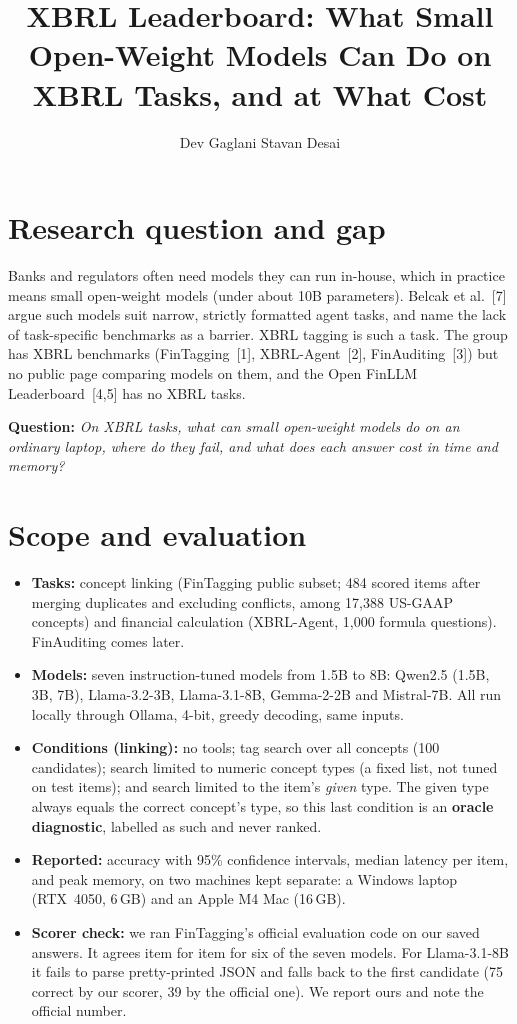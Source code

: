 \documentclass[10pt]{article}
\title{\vspace{-1.5cm}\large\textbf{XBRL Leaderboard: What Small Open-Weight Models Can Do on XBRL Tasks, and at What Cost}}
\author{\normalsize Dev Gaglani \quad Stavan Desai}
\date{}
\begin{document}
\maketitle
\vspace{-1.3cm}

\section{Research question and gap}
Banks and regulators often need models they can run in-house, which in practice means small open-weight models
(under about 10B parameters). Belcak et al.~[7] argue such models suit narrow, strictly formatted agent tasks, and name
the lack of task-specific benchmarks as a barrier. XBRL tagging is such a task. The group has XBRL benchmarks
(FinTagging~[1], XBRL-Agent~[2], FinAuditing~[3]) but no public page comparing models on them, and the Open FinLLM
Leaderboard~[4,5] has no XBRL tasks.

\textbf{Question:} \emph{On XBRL tasks, what can small open-weight models do on an ordinary laptop, where do they fail,
and what does each answer cost in time and memory?}

\section{Scope and evaluation}
\begin{itemize}
\item \textbf{Tasks:} concept linking (FinTagging public subset; 484 scored items after merging duplicates and
excluding conflicts, among 17{,}388 US-GAAP concepts) and financial calculation (XBRL-Agent, 1{,}000 formula questions).
FinAuditing comes later.
\item \textbf{Models:} seven instruction-tuned models from 1.5B to 8B: Qwen2.5 (1.5B, 3B, 7B), Llama-3.2-3B,
Llama-3.1-8B, Gemma-2-2B and Mistral-7B. All run locally through Ollama, 4-bit, greedy decoding, same inputs.
\item \textbf{Conditions (linking):} no tools; tag search over all concepts (100 candidates); search limited to
numeric concept types (a fixed list, not tuned on test items); and search limited to the item's \emph{given} type.
The given type always equals the correct concept's type, so this last condition is an \textbf{oracle diagnostic},
labelled as such and never ranked.
\item \textbf{Reported:} accuracy with 95\% confidence intervals, median latency per item, and peak memory, on two
machines kept separate: a Windows laptop (RTX~4050, 6\,GB) and an Apple M4 Mac (16\,GB).
\item \textbf{Scorer check:} we ran FinTagging's official evaluation code on our saved answers. It agrees item for
item for six of the seven models. For Llama-3.1-8B it fails to parse pretty-printed JSON and falls
back to the first candidate (75 correct by our scorer, 39 by the official one). We report ours and note
the official number.
\end{itemize}
\end{document}
